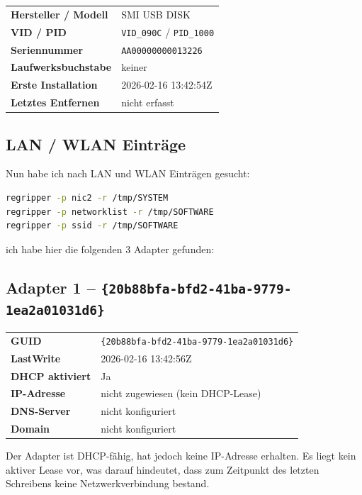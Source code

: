 \begin{tabular}{ll}
	\textbf{Hersteller / Modell}   & SMI USB DISK \\
	\textbf{VID / PID}             & \texttt{VID\_090C} / \texttt{PID\_1000} \\
	\textbf{Seriennummer}          & \texttt{AA00000000013226} \\
	\textbf{Laufwerksbuchstabe}    & keiner \\
	\textbf{Erste Installation}    & 2026-02-16 13:42:54Z \\
	\textbf{Letztes Entfernen}     & nicht erfasst \\
\end{tabular}

\subsection*{LAN / WLAN Einträge}

Nun habe ich nach LAN und WLAN Einträgen gesucht:

\begin{lstlisting}[language=bash]
regripper -p nic2 -r /tmp/SYSTEM
regripper -p networklist -r /tmp/SOFTWARE
regripper -p ssid -r /tmp/SOFTWARE
\end{lstlisting}

ich habe hier die folgenden 3 Adapter gefunden:

\subsection*{Adapter 1 – \texttt{\{20b88bfa-bfd2-41ba-9779-1ea2a01031d6\}}}

\begin{tabular}{ll}
	\textbf{GUID}            & \texttt{\{20b88bfa-bfd2-41ba-9779-1ea2a01031d6\}} \\
	\textbf{LastWrite}       & 2026-02-16 13:42:56Z \\
	\textbf{DHCP aktiviert}  & Ja \\
	\textbf{IP-Adresse}      & nicht zugewiesen (kein DHCP-Lease) \\
	\textbf{DNS-Server}      & nicht konfiguriert \\
	\textbf{Domain}          & nicht konfiguriert \\
\end{tabular}

\medskip
\noindent
Der Adapter ist DHCP-fähig, hat jedoch keine IP-Adresse erhalten. Es liegt kein
aktiver Lease vor, was darauf hindeutet, dass zum Zeitpunkt des letzten Schreibens
keine Netzwerkverbindung bestand.

